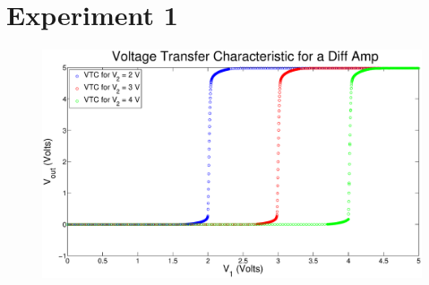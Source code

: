 \section*{Experiment 1}

\begin{figure}[H]
\centering
\includegraphics[width=\linewidth]{../Figures/Exp1.eps}
\caption{}
\label{fig:exp1p1}
\end{figure}